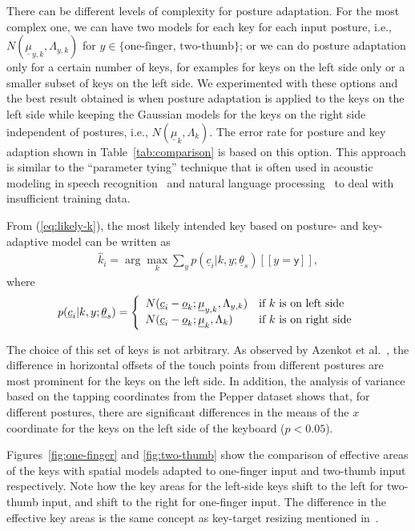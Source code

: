 \documentclass{sigchi}
\begin{document}
There can be different levels of complexity for posture adaptation. For the most complex one, we can have
two models for each key for each input posture, i.e., $N(\underline \mu_{y,k}, \Lambda_{y,k})$ for $y \in
\{\text{one-finger, two-thumb}\}$; or we can do posture adaptation only for a certain
number of keys, for examples for keys on the left side only or a smaller subset of keys on the left side. We experimented with these options and the best result obtained is when posture adaptation is applied to the keys on 
the left side while keeping the Gaussian models for the keys on the right side independent of postures, i.e., $N(\underline\mu_k, \Lambda_k)$.
The error rate for posture and key adaption shown in Table~\ref{tab:comparison} is based on 
this option. This approach is similar to the ``parameter tying'' technique that is often used in acoustic modeling in speech recognition~\cite{Bellegarda:1989} and natural language processing~\cite{Lin:1995} to deal with insufficient training data.

From (\ref{eq:likely-k}), the most likely intended key based on posture- and key-adaptive model can be written as
\begin{align}          
\hat k_i = \arg\max_k \sum_{y} p(\underline c_i | k, y; \underline\theta_s)[[y = \textsf{y}]],
\end{align}
where
\begin{align}
p(\underline c_i | k, y; \underline\theta_s) = \left\{
  \begin{array}{l l}
  N(\underline c_i - \underline o_k; \underline \mu_{y, k}, \Lambda_{y,k}) & \text{if $k$ is on left side} \\
  N(\underline c_i - \underline o_k; \underline \mu_{k}, \Lambda_{k}) & \text{if $k$ is on right side} \\
\end{array} \right.
\end{align}

The choice of this set of keys is not arbitrary. As observed by Azenkot et
al.~\cite{Azenkot:2012},  the difference in horizontal offsets of the touch
points  from different postures are most prominent for the keys on the left side.
In addition, the analysis of variance based on the tapping coordinates from the
Pepper dataset shows that, for different postures, there are significant
differences in the means of the $x$ coordinate for the keys on the left side of the keyboard ($p < 0.05$). 

Figures~\ref{fig:one-finger} and \ref{fig:two-thumb} show the comparison of effective areas of the keys
with spatial models adapted to one-finger input and two-thumb input respectively. Note how the key areas for the left-side keys shift to the left
for two-thumb input, and shift to the right for one-finger input. The difference in 
the effective key areas is the same concept as key-target resizing mentioned in~\cite{Gunawardana:2010, Rudchenko:2011}.
\end{document}
